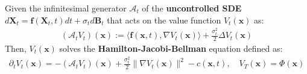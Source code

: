 \documentclass{article}
\begin{document}
\begin{lemma}\label{lemma:soc-hjb-eq}
    Given the infinitesimal generator $\mathcal{A}_t$ of the \textbf{uncontrolled SDE} $d\boldsymbol{X}_t=\boldsymbol{f}(\boldsymbol{X}_t,t)dt+\sigma_td\boldsymbol{B}_t$ that acts on the value function $V_t(\boldsymbol{x})$ as: 
    \begin{align}
        (\mathcal{A}_tV_t)(\boldsymbol{x}) :=\langle \boldsymbol{f}(\boldsymbol{x},t),  \nabla V_t(\boldsymbol{x})\rangle +\frac{\sigma_t^2}{2}\Delta V_t(\boldsymbol{x})
    \end{align}
    Then, $V_t(\boldsymbol{x})$ solves the \textbf{Hamilton-Jacobi-Bellman} equation defined as:
    \begin{align}
        \partial_tV_t(\boldsymbol{x})=-(\mathcal{A}_tV_t)(\boldsymbol{x})+\frac{\sigma_t^2}{2}\|\nabla V_t(\boldsymbol{x})\|^2-c(\boldsymbol{x},t), \quad V_T(\boldsymbol{x})=\Phi(\boldsymbol{x})\tag{Value HJB Equation}\label{eq:soc-hjb-eq}
    \end{align}
\end{lemma}
\end{document}
